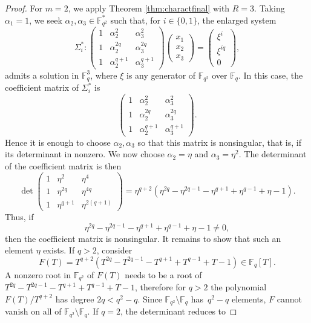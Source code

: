 \documentclass[11pt,a4paper,reqno]{article}
\numberwithin{equation}{section}
\theoremstyle{definition}
\newcommand{\numberset}{\mathbb}
\newcommand{\F}{\numberset{F}}
\newcommand{\fq}{\F_q}
\begin{document}
\begin{proof}
For \(m=2\), we apply Theorem \ref{thm:charactfinal} with \(R=3\). Taking
\(\alpha_1=1\), we seek \(\alpha_2,\alpha_3\in\mathbb F_{q^2}^{*}\) such that, for
\(i\in\{0,1\}\), the enlarged system
\[ \Sigma_i^* \colon \begin{pmatrix}
1 & \alpha_2^2 & \alpha_3^2\\
1 & \alpha_2^{2	q} & \alpha_3^{2q}\\
1 & \alpha_2^{q+1} &  \alpha_3^{q+1}
\end{pmatrix}
\begin{pmatrix} x_1 \\ x_2 \\ x_3 \end{pmatrix} = \begin{pmatrix} \xi^i \\ \xi^{iq} \\ 0 \end{pmatrix},
 \]
admits a solution in
\(\mathbb F_q^3\), where $\xi$ is any generator of $\F_{q^2}$ over $\fq$.
In this case, the coefficient matrix of \(\Sigma_i^*\) is
\[
\begin{pmatrix}
1 & \alpha_2^2 & \alpha_3^2\\
1 & \alpha_2^{2q} & \alpha_3^{2q}\\
1 & \alpha_2^{q+1} & \alpha_3^{q+1}
\end{pmatrix}.
\]
Hence it is enough to choose \(\alpha_2,\alpha_3\) so that this matrix is nonsingular, that is, if its determinant in nonzero. We now choose \(\alpha_2=\eta\) and \(\alpha_3=\eta^2\). The determinant of the
coefficient matrix is then
\[
\det
\begin{pmatrix}
1 & \eta^2 & \eta^4\\
1 & \eta^{2q} & \eta^{4q}\\
1 & \eta^{q+1} & \eta^{2(q+1)}
\end{pmatrix}
=
\eta^{q+2}
\left(
\eta^{2q}-\eta^{2q-1}-\eta^{q+1}+\eta^{q-1}+\eta-1
\right).
\]
Thus, if
\[
\eta^{2q}-\eta^{2q-1}-\eta^{q+1}+\eta^{q-1}+\eta-1\neq 0,
\]
then the coefficient matrix is nonsingular. It remains to show that such an element \(\eta\) exists. If \(q>2\), consider
\[
F(T)=T^{q+2}
\left(
T^{2q}-T^{2q-1}-T^{q+1}+T^{q-1}+T-1
\right)\in \mathbb F_q[T].
\]
A nonzero root in $\F_{q^2}$ of $F(T)$ needs to be a root of $T^{2q}-T^{2q-1}-T^{q+1}+T^{q-1}+T-1$, therefore for $q>2$  the polynomial \(F(T)/T^{q+2}\) has degree \(2q<q^2-q\). Since \(\mathbb F_{q^2}\setminus\mathbb F_q\) has~\(q^2-q\) elements, \(F\) cannot
vanish on all of \(\mathbb F_{q^2}\setminus\mathbb F_q\). If \(q=2\), the determinant reduces to

\end{proof}
\end{document}
